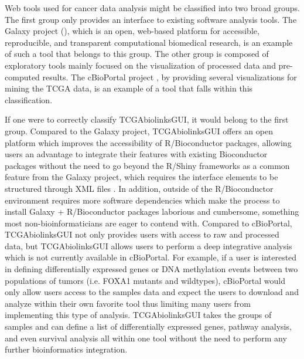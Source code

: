 Web tools used for cancer data analysis might be classified into two broad groups. 
The first group only provides an interface to existing software analysis tools.
The Galaxy project (), which is an open, web-based platform for accessible, reproducible, and transparent computational biomedical research, is an example of such a tool that belongs to this group.
The other group is composed of exploratory tools mainly focused on the visualization of processed data and pre-computed results. The cBioPortal project \cite{gao2013integrative,cerami2012cbio}, by providing several visualizations for mining the TCGA data, is an example of a tool that falls within this classification.

If one were to correctly classify TCGAbiolinksGUI, it would belong to the first group. Compared to the Galaxy project, TCGAbiolinksGUI offers an open platform which improves the accessibility of R/Bioconductor packages, allowing users an advantage to integrate their features with existing Bioconductor packages without the need to go beyond the R/Shiny frameworks as a common feature from the Galaxy project, which requires the interface elements to be structured through XML files \cite{10.12688/f1000research.9821.1}. 
In addition, outside of the R/Bioconductor environment requires more software dependencies which make the process to install Galaxy + R/Bioconductor packages laborious and cumbersome, something most non-bioinformaticians are eager to contend with.
Compared to cBioPortal, TCGAbiolinksGUI not only provides users with access to raw and processed data, but TCGAbiolinksGUI allows users to perform a deep integrative analysis which is not currently available in cBioPortal.  For example, if a user is interested in defining differentially expressed genes or DNA methylation events between two populations of tumors (i.e. FOXA1 mutants and wildtypes), cBioPortal would only allow users access to the samples data and expect the users to download and analyze within their own favorite tool thus limiting many users from implementing this type of analysis. TCGAbiolinksGUI takes the groups of samples and can define a list of differentially expressed genes, pathway analysis, and even survival analysis all within one tool without the need to perform any further bioinformatics integration. 

